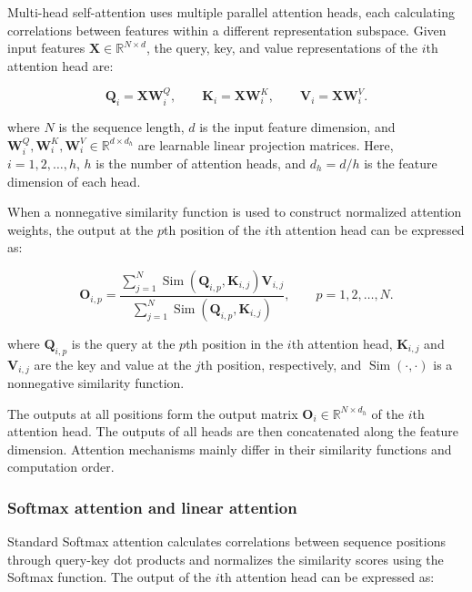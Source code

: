 Multi-head self-attention uses multiple parallel attention heads, each calculating correlations between features within a different representation subspace\cite{ref34}. Given input features $\mathbf X\in\mathbb R^{N\times d}$, the query, key, and value representations of the $i$th attention head are:

\begin{equation}
\mathbf Q_i=\mathbf X\mathbf W_i^Q,\qquad
\mathbf K_i=\mathbf X\mathbf W_i^K,\qquad
\mathbf V_i=\mathbf X\mathbf W_i^V.
\label{eq:qkv_projection}
\end{equation}

where $N$ is the sequence length, $d$ is the input feature dimension, and $\mathbf W_i^Q,\mathbf W_i^K,\mathbf W_i^V\in\mathbb R^{d\times d_h}$ are learnable linear projection matrices. Here, $i=1,2,\ldots,h$, $h$ is the number of attention heads, and $d_h=d/h$ is the feature dimension of each head.

When a nonnegative similarity function is used to construct normalized attention weights, the output at the $p$th position of the $i$th attention head can be expressed as:

\begin{equation}
\mathbf O_{i,p}
=
\frac{
\displaystyle\sum_{j=1}^{N}
\operatorname{Sim}\left(\mathbf Q_{i,p},\mathbf K_{i,j}\right)\mathbf V_{i,j}
}{
\displaystyle\sum_{j=1}^{N}
\operatorname{Sim}\left(\mathbf Q_{i,p},\mathbf K_{i,j}\right)
},
\qquad p=1,2,\ldots,N.
\label{eq:general_attention}
\end{equation}

where $\mathbf Q_{i,p}$ is the query at the $p$th position in the $i$th attention head, $\mathbf K_{i,j}$ and $\mathbf V_{i,j}$ are the key and value at the $j$th position, respectively, and $\operatorname{Sim}(\cdot,\cdot)$ is a nonnegative similarity function.

The outputs at all positions form the output matrix $\mathbf O_i\in\mathbb R^{N\times d_h}$ of the $i$th attention head. The outputs of all heads are then concatenated along the feature dimension. Attention mechanisms mainly differ in their similarity functions and computation order.

\subsubsection{Softmax attention and linear attention}

Standard Softmax attention calculates correlations between sequence positions through query-key dot products and normalizes the similarity scores using the Softmax function\cite{ref34}. The output of the $i$th attention head can be expressed as:


